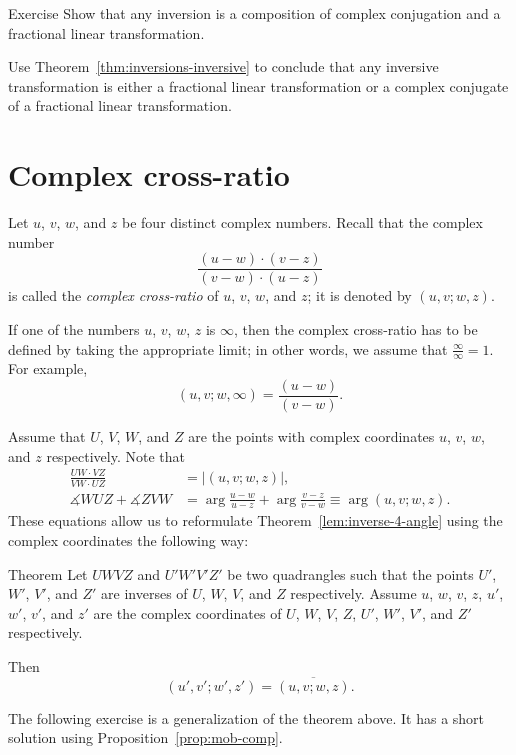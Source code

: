 \begin{thm}{Exercise}\label{ex:inversion-Mob}
Show that any inversion is a composition of complex conjugation and a fractional linear transformation.

Use Theorem~\ref{thm:inversions-inversive} to conclude that any inversive transformation is either a fractional linear transformation or a complex conjugate of a fractional linear transformation.
\end{thm}

\section{Complex cross-ratio}

Let $u$, $v$, $w$, and $z$ be four distinct complex numbers.
Recall that 
the complex number
$$
\frac{(u-w)\cdot(v-z)}{(v-w)\cdot(u-z)}$$
is called the \emph{complex cross-ratio} of $u$, $v$, $w$, and $z$; 
it is denoted by $(u,v;w,z)$.

If one of the numbers $u$, $v$, $w$, $z$ is $\infty$, 
then the complex cross-ratio has to be defined by taking the appropriate limit; in other words, we assume that $\frac\infty\infty=1$.
For example,
$$(u, v; w, \infty)=\frac{(u-w)}{(v-w)}.$$

Assume that $U$, $V$, $W$, and  $Z$ are the points with complex coordinates  
$u$, $v$, $w$, and $z$ respectively.
Note that 
\begin{align*}
\frac{UW\cdot VZ}{VW\cdot UZ}&=|(u,v;w,z)|,
\\
\measuredangle WUZ +\measuredangle ZVW&=\arg\frac{u-w}{u-z}+\arg\frac{v-z}{v-w}\equiv \arg(u,v;w,z).
\end{align*}
These equations allow us to reformulate Theorem~\ref{lem:inverse-4-angle} using the complex coordinates
the following way:

\begin{thm}{Theorem}\label{lem:inverse-4-angle-C}
Let $UWVZ$ and $U'W'V'Z'$  be two quadrangles 
such that the points $U'$, $W'$, $V'$, and $Z'$ are inverses of $U$, $W$, $V$, and $Z$ respectively.
Assume $u$, $w$, $v$, $z$, $u'$, $w'$, $v'$, and $z'$ are the complex coordinates of $U$, $W$, $V$, $Z$, $U'$, $W'$, $V'$, and $Z'$ respectively.

Then 
$$(u',v';w',z')=\overline{(u,v;w,z)}.$$

\end{thm}

The following exercise is a generalization of the theorem above.
It has a short solution using Proposition~\ref{prop:mob-comp}.

